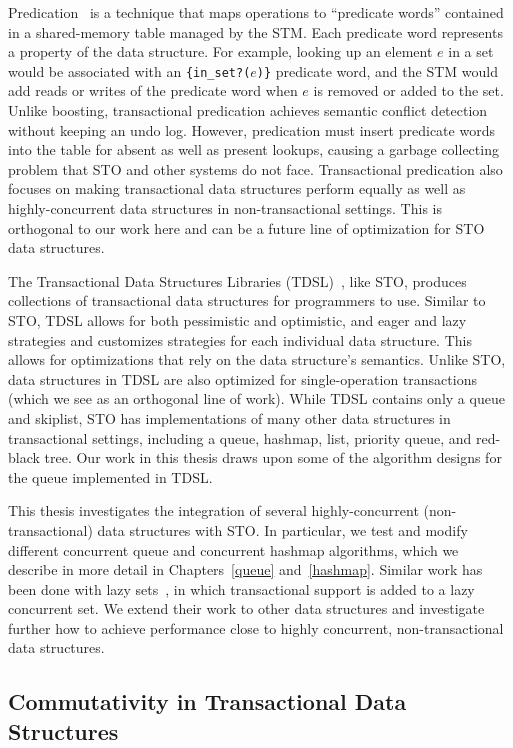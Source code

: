 Predication~\cite{predication} is a technique that maps operations to ``predicate words'' contained in a shared-memory table managed by the STM. Each predicate word represents a property of the data structure. For example, looking up an element $e$ in a set would be associated with an \texttt{\{in\_set?($e$)\}} predicate word, and the STM would add reads or writes of the predicate word when $e$ is removed or added to the set. 
Unlike boosting, transactional predication achieves semantic conflict detection without keeping an undo log. However, predication must insert predicate words into the table for absent as well as present lookups, causing a garbage collecting problem that STO and other systems do not face. Transactional predication also focuses on making transactional data structures perform equally as well as highly-concurrent data structures in non-transactional settings. This is orthogonal to our work here and can be a future line of optimization for STO data structures.

The Transactional Data Structures Libraries (TDSL)~\cite{tdsl}, like STO, produces collections of transactional data structures for programmers to use. Similar to STO, TDSL allows for both pessimistic and optimistic, and eager and lazy strategies and customizes strategies for each individual data structure. This allows for optimizations that rely on the data structure's semantics. Unlike STO, data structures in TDSL are also optimized for single-operation transactions (which we see as an orthogonal line of work). While TDSL contains only a queue and skiplist, STO has implementations of many other data structures in transactional settings, including a queue, hashmap, list, priority queue, and red-black tree. Our work in this thesis draws upon some of the algorithm designs for the queue implemented in TDSL.

This thesis investigates the integration of several highly-concurrent (non-transactional) data structures with STO. In particular, we test and modify different concurrent queue and concurrent hashmap algorithms, which we describe in more detail in Chapters~\ref{queue} and~\ref{hashmap}. Similar work has been done with lazy sets~\cite{lazyset}, in which transactional support is added to a lazy concurrent set. We extend their work to other data structures and investigate further how to achieve performance close to highly concurrent, non-transactional data structures.

\subsection{Commutativity in Transactional Data Structures}

